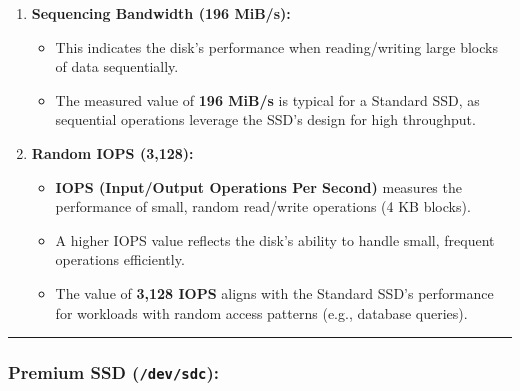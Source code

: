 \documentclass[11pt]{article}
\providecommand{\tightlist}{%
      \setlength{\itemsep}{0pt}\setlength{\parskip}{0pt}}
\begin{document}
\begin{enumerate}
\def\labelenumi{\arabic{enumi}.}
\tightlist
\item
  \textbf{Sequencing Bandwidth (196 MiB/s):}

  \begin{itemize}
  \tightlist
  \item
    This indicates the disk's performance when reading/writing large
    blocks of data sequentially.
  \item
    The measured value of \textbf{196 MiB/s} is typical for a Standard
    SSD, as sequential operations leverage the SSD's design for high
    throughput.
  \end{itemize}
\item
  \textbf{Random IOPS (3,128):}

  \begin{itemize}
  \tightlist
  \item
    \textbf{IOPS (Input/Output Operations Per Second)} measures the
    performance of small, random read/write operations (4 KB blocks).
  \item
    A higher IOPS value reflects the disk's ability to handle small,
    frequent operations efficiently.
  \item
    The value of \textbf{3,128 IOPS} aligns with the Standard SSD's
    performance for workloads with random access patterns (e.g.,
    database queries).
  \end{itemize}
\end{enumerate}

\begin{center}\rule{0.5\linewidth}{0.5pt}\end{center}

\subsubsection{\texorpdfstring{\textbf{Premium SSD
(\texttt{/dev/sdc}):}}{Premium SSD (/dev/sdc):}}\label{premium-ssd-devsdc}
\end{document}

